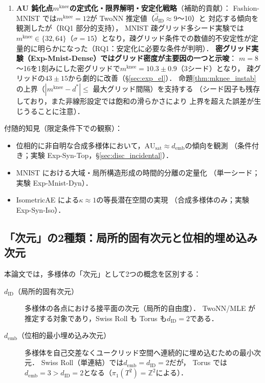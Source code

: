 \documentclass[11pt,a4paper]{jsarticle}
\newcommand{\dID}{d_{\mathrm{ID}}}
\newcommand{\kap}{\kappa}
\newcommand{\AUsat}{\mathrm{AU}_{\mathrm{sat}}}
\newcommand{\mknee}{m^{\mathrm{knee}}}
\newcommand{\demb}{d_{\mathrm{emb}}}
\begin{document}
\begin{enumerate}
        stable identification 判定基準（§\ref{sec:natimg_stable_id}），
        および$\mknee$検出法比較（実験 Exp-NatImg-Knee）を追加した．
  \item \textbf{AU 鈍化点$\mknee$の定式化・限界解明・安定化戦略}（補助的貢献）：
        Fashion-MNIST では$\mknee = 12$が TwoNN 推定値（$\hat{d}_\mathrm{ID} \approx 9$〜10）と
        対応する傾向を観測したが（RQ1 部分的支持），
        MNIST 疎グリッド多シード実験では$\mknee \in \{32,64\}$（$\sigma=15$）となり，疎グリッド条件での数値的不安定性が定量的に明らかになった（RQ1：安定化に必要な条件が判明）．
        \textbf{密グリッド実験（Exp-Mnist-Dense）ではグリッド密度が主要因の一つと示唆}：
        $m=8$〜16を1刻みにした密グリッドで$\mknee = 10.3 \pm 0.9$（3シード）となり，
        疎グリッドの$43 \pm 15$から劇的に改善（§\ref{sec:exp_el}）．
        命題\ref{thm:mknee_instab}の上界（$|\mknee - d^*| \leq$ 最大グリッド間隔）を支持する
        （シード因子も残存しており，また非線形設定では飽和の滑らかさにより
        上界を超えた誤差が生じうることに注意）．
\end{enumerate}

付随的知見（限定条件下での観察）：
\begin{itemize}
  \item 位相的に非自明な合成多様体において，$\AUsat \approx \demb$の傾向を観測
        （条件付き；実験 Exp-Syn-Top，§\ref{sec:disc_incidental}）．
  \item MNIST における大域・局所構造形成の時間的分離の定量化
        （単一シード；実験 Exp-Mnist-Dyn）．
  \item IsometricAE による$\kap \approx 1$の等長潜在空間の実現
        （合成多様体のみ；実験 Exp-Syn-Iso）．
\end{itemize}

\subsection{「次元」の2種類：局所的固有次元と位相的埋め込み次元}\label{sec:intro_dim}

本論文では，多様体の「次元」として2つの概念を区別する：

\begin{description}
  \item[$\dID$（局所的固有次元）]
        多様体の各点における接平面の次元（局所的自由度）．
        TwoNN/MLE が推定する対象であり，Swiss Roll も Torus も$\dID = 2$である．
  \item[$\demb$（位相的最小埋め込み次元）]
        多様体を自己交差なくユークリッド空間へ連続的に埋め込むための最小次元．
        Swiss Roll（単連結）では$\demb = \dID = 2$だが，
        Torus では$\demb = 3 > \dID = 2$となる（$\pi_1(T^2) = \mathbb{Z}^2$による）．
\end{description}
\end{document}
